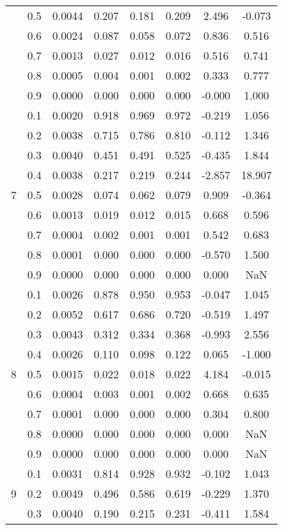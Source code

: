 \documentclass[11pt,a4paper]{report}
\begin{document}
\begin{longtable}{ | c | c || c | c | c | c | c | c | }
 & 0.5 & 0.0044 & 0.207 & 0.181 & 0.209 & 2.496 & -0.073 \\
 & 0.6 & 0.0024 & 0.087 & 0.058 & 0.072 & 0.836 & 0.516 \\
 & 0.7 & 0.0013 & 0.027 & 0.012 & 0.016 & 0.516 & 0.741 \\
 & 0.8 & 0.0005 & 0.004 & 0.001 & 0.002 & 0.333 & 0.777 \\
 & 0.9 & 0.0000 & 0.000 & 0.000 & 0.000 & -0.000 & 1.000 \\
 \hline
\multirow{9}{*}{7} & 0.1 & 0.0020 & 0.918 & 0.969 & 0.972 & -0.219 & 1.056 \\
 & 0.2 & 0.0038 & 0.715 & 0.786 & 0.810 & -0.112 & 1.346 \\
 & 0.3 & 0.0040 & 0.451 & 0.491 & 0.525 & -0.435 & 1.844 \\
 & 0.4 & 0.0038 & 0.217 & 0.219 & 0.244 & -2.857 & 18.907 \\
 & 0.5 & 0.0028 & 0.074 & 0.062 & 0.079 & 0.909 & -0.364 \\
 & 0.6 & 0.0013 & 0.019 & 0.012 & 0.015 & 0.668 & 0.596 \\
 & 0.7 & 0.0004 & 0.002 & 0.001 & 0.001 & 0.542 & 0.683 \\
 & 0.8 & 0.0001 & 0.000 & 0.000 & 0.000 & -0.570 & 1.500 \\
 & 0.9 & 0.0000 & 0.000 & 0.000 & 0.000 & 0.000 & NaN \\
 \hline
\multirow{9}{*}{8} & 0.1 & 0.0026 & 0.878 & 0.950 & 0.953 & -0.047 & 1.045 \\
 & 0.2 & 0.0052 & 0.617 & 0.686 & 0.720 & -0.519 & 1.497 \\
 & 0.3 & 0.0043 & 0.312 & 0.334 & 0.368 & -0.993 & 2.556 \\
 & 0.4 & 0.0026 & 0.110 & 0.098 & 0.122 & 0.065 & -1.000 \\
 & 0.5 & 0.0015 & 0.022 & 0.018 & 0.022 & 4.184 & -0.015 \\
 & 0.6 & 0.0004 & 0.003 & 0.001 & 0.002 & 0.668 & 0.635 \\
 & 0.7 & 0.0001 & 0.000 & 0.000 & 0.000 & 0.304 & 0.800 \\
 & 0.8 & 0.0000 & 0.000 & 0.000 & 0.000 & 0.000 & NaN \\
 & 0.9 & 0.0000 & 0.000 & 0.000 & 0.000 & 0.000 & NaN \\
 \hline
\multirow{9}{*}{9} & 0.1 & 0.0031 & 0.814 & 0.928 & 0.932 & -0.102 & 1.043 \\
 & 0.2 & 0.0049 & 0.496 & 0.586 & 0.619 & -0.229 & 1.370 \\
 & 0.3 & 0.0040 & 0.190 & 0.215 & 0.231 & -0.411 & 1.584 \\

\end{longtable}
\end{document}

